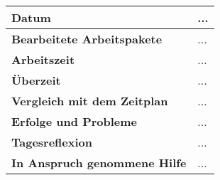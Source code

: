 \newpage

\begin{longtable}{p{}|p{}}
	\hline
	\textbf{Datum}                       & ... \\
	\hline
	\textbf{Bearbeitete Arbeitspakete}   & ... \\
	\hline
	\textbf{Arbeitszeit}                 & ... \\
	\hline
	\textbf{Überzeit}                    & ... \\
	\hline
	\textbf{Vergleich mit dem Zeitplan}  & ... \\
	\hline
	\textbf{Erfolge und Probleme}        & ...
	\\
	\hline
	\textbf{Tagesreflexion}              & ...
	\\
	\hline
	\textbf{In Anspruch genommene Hilfe} & ... \\
	\hline
\end{longtable}\label{tab:arbeitsprotokoll-...}
\newpage
